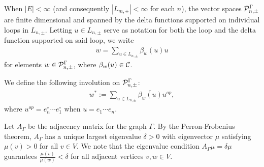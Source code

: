 When $|E|<\infty$ (and consequently $|L_{m,\pm}|<\infty$ for each $n$), the vector spaces $\mathcal{P}_{n,\pm}^\Gamma$ are finite dimensional and spanned by the delta functions supported on individual loops in $L_{n,\pm}$. Letting $u\in L_{n,\pm}$ serve as notation for both the loop and the delta function supported on said loop, we write
\begin{align*}
w=\sum_{u\in L_{n,\pm}} \beta_w(u) u
\end{align*}
for elements $w\in \mathcal{P}_{n,\pm}^\Gamma$, where $\beta_w(u)\in \mathcal C$.

We define the following involution on $\mathcal{P}_{n,\pm}^\Gamma$:
\begin{align*}
w^*:=\sum_{u\in L_{n,\pm}} \overline{\beta_w(u)} u^{op},
\end{align*}
where $u^{op}=e_n^\circ\cdots e_1^\circ$ when $u=e_1\cdots e_n$.

Let $A_\Gamma$ be the adjacency matrix for the graph $\Gamma$. By the Perron-Frobenius theorem, $A_\Gamma$ has a unique largest eigenvalue $\delta>0$ with eigenvector $\mu$ satisfying $\mu(v)>0$ for all $v\in V$. We note that the eigenvalue condition $A_\Gamma \mu=\delta \mu$ guarantees $\frac{\mu(v)}{\mu(w)}<\delta$ for all adjacent vertices $v,w\in V$.

